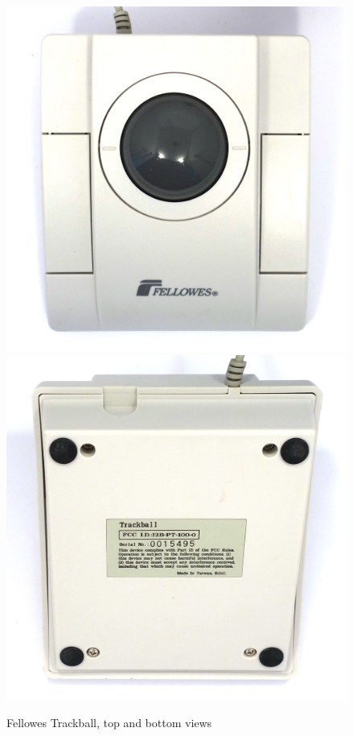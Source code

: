 \documentclass[11pt, a4paper]{article}
\begin{document}
\begin{figure}[h]
    \centering
    \includegraphics[scale=0.45]{1995_fellowes_trackball/top_60.jpg}
    \includegraphics[scale=0.45]{1995_fellowes_trackball/bottom_60.jpg}
    \caption{Fellowes Trackball, top and bottom views}
    \label{fig:FellowesTrackballTopBottom}
\end{figure}
\end{document}
